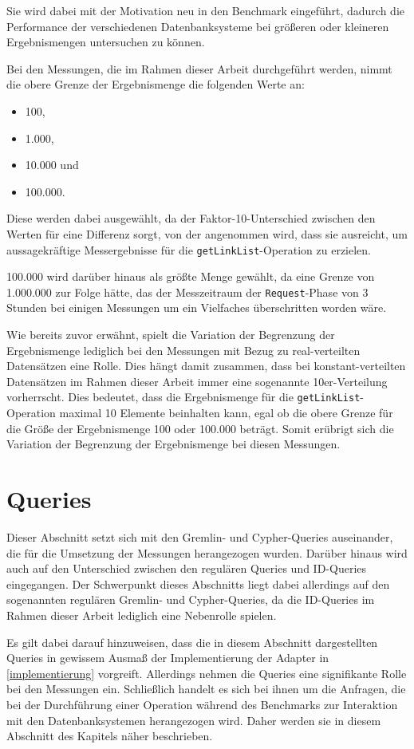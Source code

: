 Sie wird dabei mit der Motivation neu in den Benchmark eingeführt, dadurch die Performance der verschiedenen Datenbanksysteme bei größeren oder kleineren Ergebnismengen untersuchen zu können. 

Bei den Messungen, die im Rahmen dieser Arbeit durchgeführt werden, nimmt die obere Grenze der Ergebnismenge die folgenden Werte an:
\begin{itemize}
    \item 100,
    \item 1.000,
    \item 10.000 und
    \item 100.000. 
\end{itemize}
Diese werden dabei ausgewählt, da der Faktor-10-Unterschied zwischen den Werten für eine Differenz sorgt, von der angenommen wird, dass sie ausreicht, um aussagekräftige Messergebnisse für die \texttt{getLinkList}-Operation zu erzielen. 

100.000 wird darüber hinaus als größte Menge gewählt, da eine Grenze von 1.000.000 zur Folge hätte, das der Messzeitraum der \texttt{Request}-Phase von 3 Stunden bei einigen Messungen um ein Vielfaches überschritten worden wäre.

Wie bereits zuvor erwähnt, spielt die Variation der Begrenzung der Ergebnismenge lediglich bei den Messungen mit Bezug zu real-verteilten Datensätzen eine Rolle. Dies hängt damit zusammen, dass bei konstant-verteilten Datensätzen im Rahmen dieser Arbeit immer eine sogenannte 10er-Verteilung vorherrscht. Dies bedeutet, dass die Ergebnismenge für die \texttt{getLinkList}-Operation maximal 10 Elemente beinhalten kann, egal ob die obere Grenze für die Größe der Ergebnismenge 100 oder 100.000 beträgt. Somit erübrigt sich die Variation der Begrenzung der Ergebnismenge bei diesen Messungen. 

\section{Queries}
\label{analyse:queries}
Dieser Abschnitt setzt sich mit den Gremlin- und Cypher-Queries auseinander, die für die Umsetzung der Messungen herangezogen wurden. Darüber hinaus wird auch auf den Unterschied zwischen den regulären Queries und ID-Queries eingegangen. Der Schwerpunkt dieses Abschnitts liegt dabei allerdings auf den sogenannten regulären Gremlin- und Cypher-Queries, da die ID-Queries im Rahmen dieser Arbeit lediglich eine Nebenrolle spielen. 

Es gilt dabei darauf hinzuweisen, dass die in diesem Abschnitt dargestellten Queries in gewissem Ausmaß der Implementierung der Adapter in \autoref{implementierung} vorgreift. Allerdings nehmen die Queries eine signifikante Rolle bei den Messungen ein. Schließlich handelt es sich bei ihnen um die Anfragen, die bei der Durchführung einer Operation während des Benchmarks zur Interaktion mit den Datenbanksystemen herangezogen wird. Daher werden sie in diesem Abschnitt des Kapitels  näher beschrieben.

